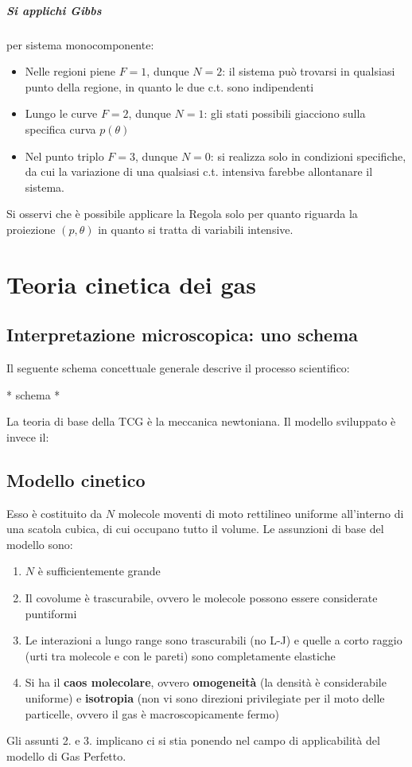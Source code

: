 \documentclass[10pt, oneside]{book}
\begin{document}
\paragraph{Si applichi Gibbs} per sistema monocomponente:
\begin{itemize}
\item Nelle regioni piene $F = 1$, dunque $N = 2$: il sistema può trovarsi in qualsiasi punto della regione, in quanto le due c.t. sono indipendenti
\item Lungo le curve $F =2$, dunque $N = 1$: gli stati possibili giacciono sulla specifica curva $p(\theta)$
\item Nel punto triplo $F = 3$, dunque $N = 0$: si realizza solo in condizioni specifiche, da cui la variazione di una qualsiasi c.t. intensiva farebbe allontanare il sistema.
\end{itemize}
Si osservi che è possibile applicare la Regola solo per quanto riguarda la proiezione $(p, \theta)$ in quanto si tratta di variabili intensive.

\chapter{Teoria cinetica dei gas}
\section{Interpretazione microscopica: uno schema}
Il seguente schema concettuale generale descrive il processo scientifico:

\begin{center}
* schema *
\end{center}
La teoria di base della TCG è la meccanica newtoniana. Il modello sviluppato è invece il:
\section{Modello cinetico}
Esso è costituito da $N$ molecole moventi di moto rettilineo uniforme all'interno di una scatola cubica, di cui occupano tutto il volume. Le assunzioni di base del modello sono:
\begin{enumerate}
\item $N$ è sufficientemente grande
\item Il covolume è trascurabile, ovvero le molecole possono essere considerate puntiformi
\item Le interazioni a lungo range sono trascurabili (no L-J) e quelle a corto raggio (urti tra molecole e con le pareti) sono completamente elastiche
\item Si ha il \textbf{caos molecolare}, ovvero  \textbf{omogeneità} (la densità è considerabile uniforme) e \textbf{isotropia} (non vi sono direzioni privilegiate per il moto delle particelle, ovvero il gas è macroscopicamente fermo)
\end{enumerate}
Gli assunti 2. e 3. implicano ci si stia ponendo nel campo di applicabilità del modello di Gas Perfetto.
\end{document}
